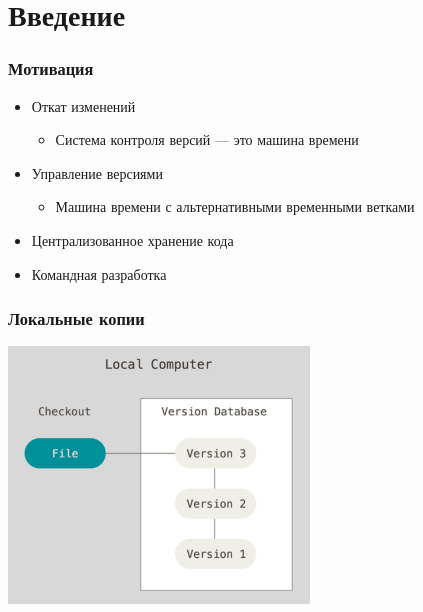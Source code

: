 \documentclass{../slides-style}
\begin{document}
    \begin{frame}[plain]
        \titlepage
    \end{frame}

    \section{Введение}

    \begin{frame}
        \frametitle{Мотивация}
        \begin{itemize}
            \item Откат изменений
            \begin{itemize}
                \item Система контроля версий --- это машина времени
            \end{itemize}
            \item Управление версиями
            \begin{itemize}
                \item Машина времени с альтернативными временными ветками
            \end{itemize}
            \item Централизованное хранение кода
            \item Командная разработка
        \end{itemize}
    \end{frame}

    \begin{frame}
        \frametitle{Локальные копии}
        \begin{center}
            \includegraphics[width=0.6\textwidth]{localCopies.png}
        \end{center}
    \end{frame}
\end{document}
